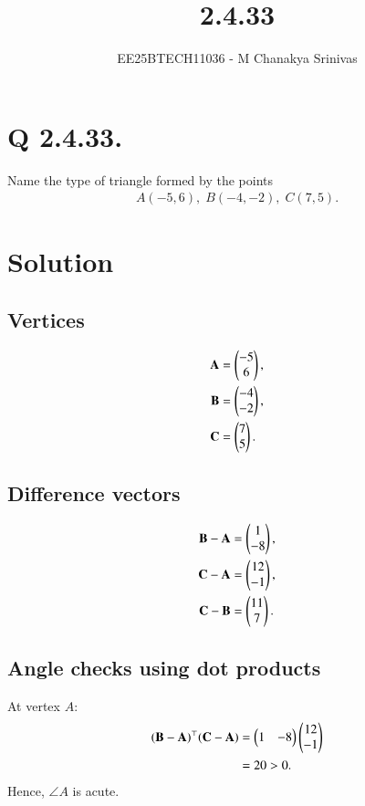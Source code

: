 \documentclass[journal]{IEEEtran}
\begin{document}

\vspace{3cm}

\title{2.4.33}
\author{EE25BTECH11036 - M Chanakya Srinivas}
\maketitle

\renewcommand{\thetable}{\theenumi}
\setlength{\intextsep}{10pt}
\renewcommand\theequation{\arabic{equation}}

\section*{Q 2.4.33.}
Name the type of triangle formed by the points
\begin{align}
A(-5,6), \; B(-4,-2), \; C(7,5).
\end{align}

\section*{Solution}

\subsection*{Vertices}
\begin{align}
\mathbf{A} &= \begin{pmatrix}-5\\6\end{pmatrix}, \label{eq:A}\\
\mathbf{B} &= \begin{pmatrix}-4\\-2\end{pmatrix}, \label{eq:B}\\
\mathbf{C} &= \begin{pmatrix}7\\5\end{pmatrix}. \label{eq:C}
\end{align}

\subsection*{Difference vectors}
\begin{align}
\mathbf{B}-\mathbf{A} &= \begin{pmatrix}1\\-8\end{pmatrix}, \label{eq:BA}\\
\mathbf{C}-\mathbf{A} &= \begin{pmatrix}12\\-1\end{pmatrix}, \label{eq:CA}\\
\mathbf{C}-\mathbf{B} &= \begin{pmatrix}11\\7\end{pmatrix}. \label{eq:CB}
\end{align}

\subsection*{Angle checks using dot products}
At vertex \(A\):  
\begin{align}
(\mathbf{B}-\mathbf{A})^\top(\mathbf{C}-\mathbf{A})
&= \begin{pmatrix}1 & -8\end{pmatrix}\begin{pmatrix}12\\-1\end{pmatrix} \\
&= 20 > 0. \label{eq:dotA}
\end{align}
Hence, \(\angle A\) is acute.
\end{document}
